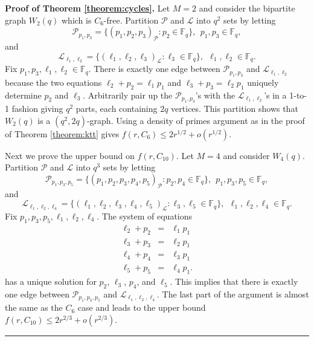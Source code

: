\documentclass[12pt]{article}%
\newenvironment{proof}[1][Proof]{\noindent\textbf{#1.} }
{\hfill \ \rule{0.5em}{0.5em}}
\begin{document}
\begin{proof}[Proof of Theorem \ref{theorem:cycles}]
Let $M=2$ and consider
the bipartite graph $W_2(q)$ which is $C_6$-free.  
Partition $\mathcal{P}$ and 
$\mathcal{L}$ into $q^2$ sets by letting 
\[
\mathcal{P}_{ p_1 , p_3 } = \{ ( p_1 , p_2 , p_3 )_{ \mathcal{P}} : p_2 \in \mathbb{F}_q \}, ~~ p_1 , p_3 \in \mathbb{F}_q,
\]
and 
\[
\mathcal{L}_{ \ell_1 , \ell_2 } = \{  ( \ell_1 , \ell_2 , \ell_3 )_{ \mathcal{L}} : \ell_3 \in \mathbb{F}_q \}, ~~ \ell_1 , \ell_2 \in \mathbb{F}_q.
\]
Fix $p_1, p_3, \ell_1 , \ell_2 \in \mathbb{F}_q$.  
There is exactly one edge between 
$\mathcal{P}_{ p_1 , p_3 }$ and $\mathcal{L}_{ \ell_1 , \ell_2 }$ 
because the two equations $\ell_2 + p_2 = \ell_1 p_1$ and $\ell_3 + p_3 = \ell_2 p_1$ uniquely determine $p_2$ and 
$\ell_3$.  Arbitrarily pair up the 
$\mathcal{P}_{ p_1 , p_3 }$'s with the $\mathcal{L}_{ \ell_1 , \ell_2 } $'s in a 1-to-1 fashion giving $q^2$ parts, each containing $2q$ vertices.  
This partition shows that $W_2(q)$ is a $(q^2 , 2q)$-graph.  
Using a density of primes argument as 
in the proof of Theorem \ref{theorem:ktt} gives 
$f(r,C_6) \leq 2 r^{1/2} + o(r^{1/2})$.  

Next we prove the upper bound on $f(r , C_{10})$.  Let $M = 4$ and consider
$W_4(q)$.  Partition $\mathcal{P}$ and $\mathcal{L}$ into $q^3$ sets by letting
\[
\mathcal{P}_{ p_1 , p_3 , p_5} = \{ ( p_1 , p_2, p_3, p_4,  p_5)_{ \mathcal{P}} : p_2 , p_4 \in \mathbb{F}_q \}, ~~ p_1 , p_3 , p_5 \in \mathbb{F}_q,
\]
and 
\[
\mathcal{L}_{ \ell_1 , \ell_2 , \ell_4 } = \{ ( \ell_1 , \ell_2 , \ell_3 , \ell_4,  \ell_5 )_{ \mathcal{L}} : \ell_3 , \ell_5 \in \mathbb{F}_q \}, 
~~ \ell_1 , \ell_2 , \ell_4 \in \mathbb{F}_q.
\]
Fix $p_1 , p_3 , p_5, \ell_1 , \ell_2 , \ell_4$.
The system of equations  
\begin{eqnarray*}
	\ell_2 + p_2 &  = & \ell_1 p_1 \\
	\ell_3 + p_3 & = & \ell_2 p_1 \\
	\ell_4 + p_4 & = & \ell_3 p_1 \\
	\ell_5 + p_5 & = & \ell_4 p_1.
\end{eqnarray*}
has a unique solution for $p_2$, $\ell_3$, $p_4$, and $\ell_5$.  
This implies that there is exactly one 
edge between $\mathcal{P}_{p_1, p_3, p_5}$ and 
$\mathcal{L}_{ \ell_1 , \ell_2 , \ell_4 }$.  The last part of the argument is 
almost the same as the $C_6$ case and leads to the upper bound 
$f(r, C_{10}) \leq 2 r^{2/3} + o( r^{2/3}) $.
\end{proof}
\end{document}
